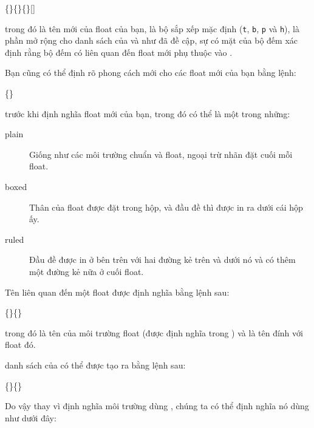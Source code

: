 \documentclass[a4paper]{report}
\begin{document}
\begin{definition}
\{\}\{\}\{\}[]
\end{definition}%
trong đó   là tên mới của float của bạn,  là bộ sắp xếp mặc định 
(\texttt{t}, \texttt{b}, \texttt{p} và \texttt{h}),  là phần mở rộng cho danh sách của  và như đã đề cập, sự có mặt của bộ đếm xác định rằng bộ đếm có liên quan đến float mới phụ thuộc vào .

Bạn cũng có thể định rõ phong cách mới cho các float mới của bạn bằng lệnh:

\begin{definition}
\{\}
\end{definition}%
\noindent trước khi định nghĩa float mới của bạn, trong đó  có thể là một trong những:
\begin{description}

\item[plain] Giống như các môi trường chuẩn  và  float, ngoại trừ nhãn đặt cuối mỗi float.

\item[boxed] Thân của float được đặt trong hộp, và đầu đề thì được in ra dưới cái hộp ấy.

\item[ruled] Đầu đề được in ở bên trên với hai đường kẻ trên và dưới nó và có thêm một đường kẻ nữa ở cuối float. 

\end{description}

Tên liên quan đến một float được định nghĩa bằng lệnh sau:
\begin{definition}
\{\}\{\}
\end{definition}%
\noindent trong đó  là tên của môi trường float (được định nghĩa trong )
và  là tên đính với float đó.

danh sách của  có thể được tạo ra bằng lệnh sau:
\begin{definition}
\{\}\{\}
\end{definition}%

Do vậy thay vì định nghĩa môi trường   dùng ,  chúng ta có thể định nghĩa nó dùng      như dưới đây:
\end{document}
